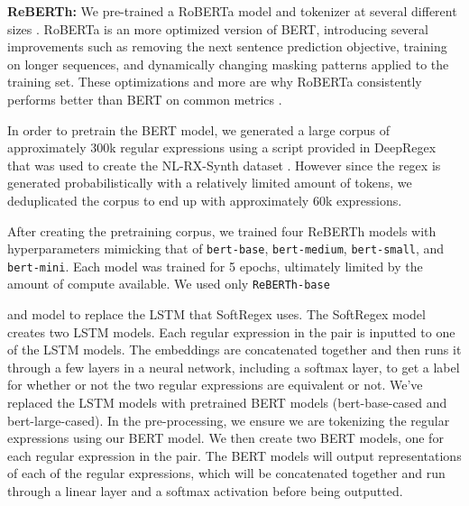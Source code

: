 \documentclass[11pt,a4paper]{article}
\begin{document}
\textbf{ReBERTh:} We pre-trained a RoBERTa model and tokenizer at several different sizes \cite{roberta}. RoBERTa is an more optimized version of BERT, introducing several improvements such as removing the next sentence prediction objective, training on longer sequences, and dynamically changing masking patterns applied to the training set. These optimizations and more are why RoBERTa consistently performs better than BERT on common metrics \cite{roberta}.

In order to pretrain the BERT model, we generated a large corpus of approximately 300k regular expressions using a script provided in DeepRegex that was used to create the NL-RX-Synth dataset \cite{locascio-etal-2016-neural}. However since the regex is generated probabilistically with a relatively limited amount of tokens, we deduplicated the corpus to end up with approximately 60k expressions.

After creating the pretraining corpus, we trained four ReBERTh models with hyperparameters mimicking that of \texttt{bert-base}, \texttt{bert-medium}, \texttt{bert-small}, and \texttt{bert-mini}. Each model was trained for 5 epochs, ultimately limited by the amount of compute available. We used only \texttt{ReBERTh-base}

and model to replace the LSTM that SoftRegex uses. The SoftRegex model creates two LSTM models. Each regular expression in the pair is inputted to one of the LSTM models. The embeddings are concatenated together and then runs it through a few layers in a neural network, including a softmax layer, to get a label for whether or not the two regular expressions are equivalent or not. We've replaced the LSTM models with pretrained BERT models (bert-base-cased and bert-large-cased). In the pre-processing, we ensure we are tokenizing the regular expressions using our BERT model. We then create two BERT models, one for each regular expression in the pair. The BERT models will output representations of each of the regular expressions, which will be concatenated together and run through a linear layer and a softmax activation before being outputted. 
\end{document}
